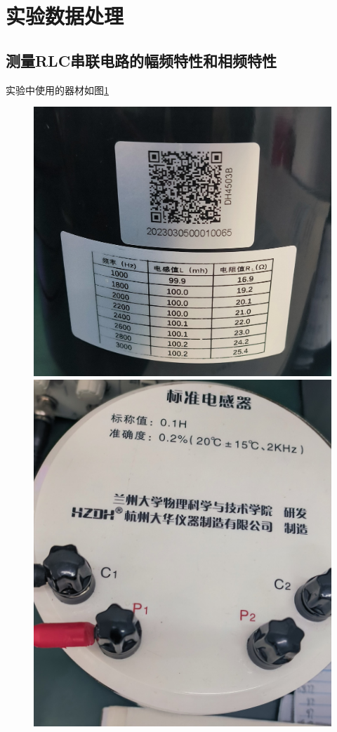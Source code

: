 \documentclass{ctexart}
\begin{document}
\section{实验数据处理}
  \subsection{测量RLC串联电路的幅频特性和相频特性}
  实验中使用的器材如图\ref{qicai}
  \begin{figure}[htbp]\label{qicai}
    \begin{minipage}[t]{0.45\textwidth}
    \centering
    \includegraphics[width=\textwidth]{qicai1}
    \end{minipage}
    \hfill
    \begin{minipage}[t]{0.45\textwidth}
    \centering
    \includegraphics[width=\textwidth]{qicai2}

\end{minipage}
\end{figure}
\end{document}
